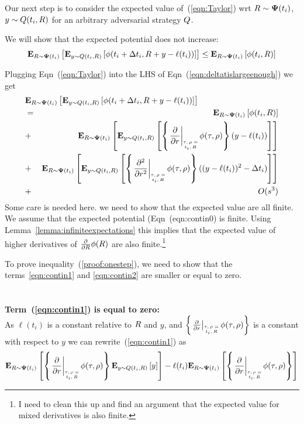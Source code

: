 \documentclass{article}[12pt]
\begin{document}
{Our next step is to consider the expected value of~(\ref{eqn:Taylor}) wrt $R \sim {\bf \Psi}(t_i)$,
$y \sim Q(t_i,R)$ for an arbitrary adversarial strategy
$Q$.

We will show that the expected potential does not increase:
\begin{equation} \label{eqn:deltatislargeenough}
     {\bf E}_{R \sim {\bf \Psi}(t_i)}\left[  {\bf E}_{y \sim Q(t_i,R)}\left[ \phi(t_i+\Delta t_i,R+y-\ell(t_i)) \right] \right] \leq {\bf E}_{R \sim {\bf \Psi}(t_i)}\left[ \phi(t_i,R) \right]
\end{equation}

Plugging Eqn~(\ref{eqn:Taylor}) into the LHS of
Eqn~(\ref{eqn:deltatislargeenough}) we get
\begin{eqnarray}
  \lefteqn{\E{\R \sim \state(t_i)}{\E{y \sim \adversM(t_i,\R)}{\pot(t_i+\deltat_i,\R+y-\ell(t_i))}}} \\
  &=& \E{\R \sim \state(t_i)}{\pot(t_i,\R)} \label{eqn:contin0}\\
  &+& \E{\R \sim \state(t_i)}{\E{y \sim \adversM(t_i,\R)}{\at{\frac{\partial}{\partial r}} (y-\ell(t_i))}} \label{eqn:contin1}\\
  &+& \E{\R \sim \state(t_i)}{\E{y \sim
      \adversM(t_i,\R)}{\at{\frac{\partial^2}{\partial r^2}}
      ((y-\ell(t_i))^2 - \deltat_i)}}
  \label{eqn:contin2}\\
  &+& O(s^3) \label{eqn:contin3}
\end{eqnarray}
Some care is needed here. we need to show that the expected value
are all finite. We assume that the expected potential
(Eqn~({eqn:contin0}) is finite. Using
Lemma~\ref{lemma:infiniteexpectations} this implies that the expected
value of higher derivatives of $\frac{\partial}{\partial R} \phi(R)$
are also finite.\footnote{I need to clean this up and find an argument
  that the expected value for mixed derivatives is also finite.}


To prove inequality~(\ref{proof:onestep}), we need to show that the
terms~\ref{eqn:contin1} and \ref{eqn:contin2} are smaller or equal to
zero.
~\\~\\~\\
{\bf Term~(\ref{eqn:contin1}) is equal to zero:}\\
As $\ell(t_i)$ is a constant
relative to $R$ and $y$, and $\at{\frac{\partial}{\partial r}}$ is a
constant with respect to $y$ we can rewrite~(\ref{eqn:contin1}) as
\begin{equation} \label{eqnterm1.1}
  \E{\R \sim \state(t_i)}{\at{\frac{\partial}{\partial r}}
    \E{y \sim \adversM(t_i,\R)}{y} }
- \ell(t_i) \E{\R \sim \state(t_i)}{\at{\frac{\partial}{\partial r}}}
\end{equation}

}
\end{document}
